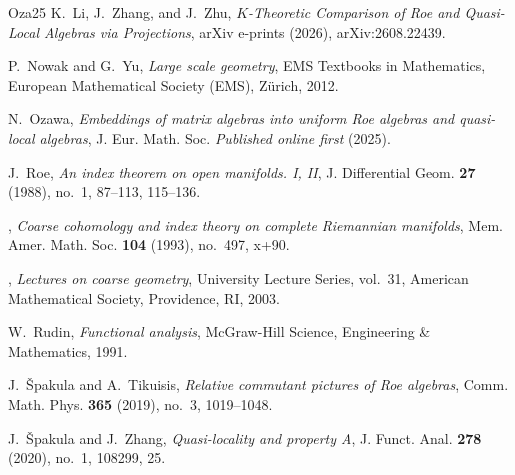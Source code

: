 \documentclass[11pt]{amsart}
\numberwithin{equation}{section}
\theoremstyle{definition}
\theoremstyle{remark}
\begin{document}
\begin{thebibliography}{{Oza}25}
K.~{Li}, J.~{Zhang}, and J.~{Zhu}, \emph{{$K$-Theoretic Comparison of Roe and
  Quasi-Local Algebras via Projections}}, arXiv e-prints (2026),
  arXiv:2608.22439.

P.~Nowak and G.~Yu, \emph{Large scale geometry}, EMS Textbooks in Mathematics,
  European Mathematical Society (EMS), Z\"urich, 2012. 

N.~{Ozawa}, \emph{{Embeddings of matrix algebras into uniform Roe algebras and
  quasi-local algebras}}, J. Eur. Math. Soc. \emph{Published online first}
  (2025).

J.~Roe, \emph{An index theorem on open manifolds. {I}, {II}}, J. Differential
  Geom. \textbf{27} (1988), no.~1, 87--113, 115--136.

\bysame, \emph{Coarse cohomology and index theory on complete {R}iemannian
  manifolds}, Mem. Amer. Math. Soc. \textbf{104} (1993), no.~497, x+90.

\bysame, \emph{Lectures on coarse geometry}, University Lecture Series,
  vol.~31, American Mathematical Society, Providence, RI, 2003.

W.~Rudin, \emph{Functional analysis}, McGraw-Hill Science, Engineering \&
  Mathematics, 1991.

J.~{\v{S}}pakula and A.~Tikuisis, \emph{Relative commutant pictures of {R}oe
  algebras}, Comm. Math. Phys. \textbf{365} (2019), no.~3, 1019--1048.

J.~{\v{S}}pakula and J.~Zhang, \emph{Quasi-locality and property {A}}, J.
  Funct. Anal. \textbf{278} (2020), no.~1, 108299, 25.

\end{thebibliography}
\end{document}
